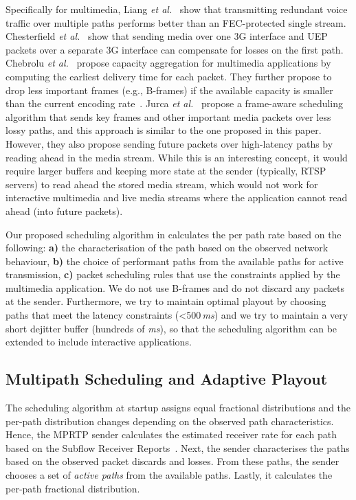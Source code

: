 Specifically for multimedia, Liang \emph{et al.}~\cite{Liang01} show that
transmitting redundant voice traffic over multiple paths performs better than 
an FEC-protected single stream. Chesterfield \emph{et al.}~\cite{1498479}
show that sending media over one 3G interface and UEP packets over a separate 
3G interface can compensate for losses on the first path. 
Chebrolu \emph{et al.}~\cite{1599407} propose capacity aggregation for
multimedia applications by computing the earliest delivery time for each
packet. They further propose to drop less important frames (e.g., B-frames) if
the available capacity is smaller than the current encoding
rate~\cite{1313320}. Jurca \emph{et al.}~\cite{4130370:jurca} propose a
frame-aware scheduling algorithm that sends key frames and other important
media packets over less lossy paths, and this approach is similar to the one
proposed in this paper. However, they also propose sending future packets over
high-latency paths by reading ahead in the media stream. While this is an
interesting concept, it would require larger buffers and keeping more state at the
sender (typically, RTSP servers) to read ahead the stored media stream, which
would not work for interactive multimedia and live media streams where the 
application cannot read ahead (into future packets).

Our proposed scheduling algorithm in  calculates the per path
rate based on the following: \textbf{a)} the characterisation of the path based on
the observed network behaviour, \textbf{b)} the choice of performant paths from the
available paths for active transmission, \textbf{c)} packet scheduling
rules that use the constraints applied by the multimedia application. We do
not use B-frames and do not discard any packets at the sender. Furthermore, we
try to maintain optimal playout by choosing paths that meet the latency
constraints (<500\,\emph{ms}) and we try to maintain a very short dejitter
buffer (hundreds of \emph{ms}), so that the scheduling algorithm can be extended
to include interactive applications.

\subsection{Multipath Scheduling and Adaptive Playout}

The scheduling algorithm at startup assigns equal fractional distributions and
the per-path distribution changes depending on the observed path
characteristics. Hence, the MPRTP sender calculates the estimated receiver
rate for each path based on the Subflow Receiver Reports~\cite{draft.mprtp}.
Next, the sender characterises the paths based on the observed packet discards
and losses. From these paths, the sender chooses a set of \emph{active paths}
from the available paths. Lastly, it calculates the per-path fractional
distribution.

